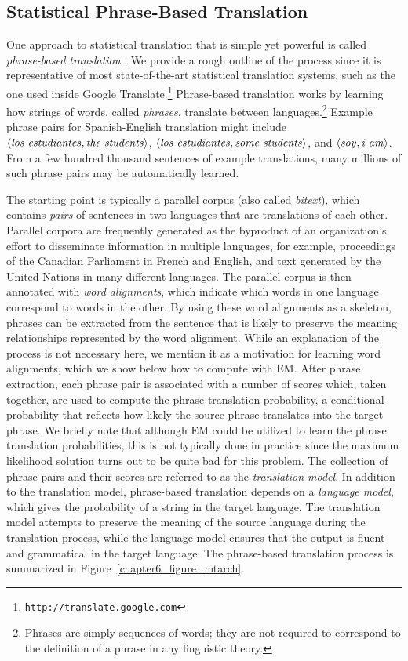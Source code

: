 \subsection{Statistical Phrase-Based Translation}

One approach to statistical translation that is simple yet powerful is
called \emph{phrase-based translation} \cite{Koehn_2003}.  We provide
a rough outline of the process since it is representative of most
state-of-the-art statistical translation systems, such as the one used
inside Google Translate.\footnote{\tt http://translate.google.com}
Phrase-based translation works by learning how strings of words,
called \emph{phrases}, translate between languages.\footnote{Phrases
  are simply sequences of words; they are not required to correspond
  to the definition of a phrase in any linguistic theory.}  Example
phrase pairs for Spanish-English translation might include $\langle
\textrm{\emph{los estudiantes}}, \textrm{\emph{the students}}\rangle$,
$\langle \textrm{\emph{los estudiantes}}, \textrm{\emph{some
    students}}\rangle$, and $\langle \textrm{\emph{soy}},
\textrm{\emph{i am}} \rangle$.  From a few hundred thousand sentences
of example translations, many millions of such phrase pairs may be
automatically learned.

The starting point is typically a parallel corpus (also called {\it
  bitext}), which contains {\it pairs} of sentences in two languages
that are translations of each other. Parallel corpora are frequently
generated as the byproduct of an organization's effort to disseminate
information in multiple languages, for example, proceedings of the
Canadian Parliament in French and English, and text generated by the
United Nations in many different languages.  The parallel corpus is
then annotated with \emph{word alignments}, which indicate which words
in one language correspond to words in the other.  By using these word
alignments as a skeleton, phrases can be extracted from the sentence
that is likely to preserve the meaning relationships represented by
the word alignment.  While an explanation of the process is not
necessary here, we mention it as a motivation for learning word
alignments, which we show below how to compute with EM.  After phrase
extraction, each phrase pair is associated with a number of scores
which, taken together, are used to compute the phrase translation
probability, a conditional probability that reflects how likely the
source phrase translates into the target phrase.  We briefly note that
although EM could be utilized to learn the phrase translation
probabilities, this is not typically done in practice since the
maximum likelihood solution turns out to be quite bad for this
problem.  The collection of phrase pairs and their scores are referred
to as the \emph{translation model}.  In addition to the translation
model, phrase-based translation depends on a \emph{language model},
which gives the probability of a string in the target language.  The
translation model attempts to preserve the meaning of the source
language during the translation process, while the language model
ensures that the output is fluent and grammatical in the target
language.  The phrase-based translation process is summarized in
Figure~\ref{chapter6_figure_mtarch}.

